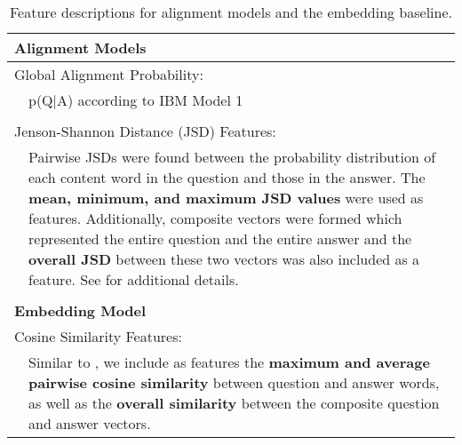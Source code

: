 

\begin{table*}[t]{}
        \centering
        \begin{tabular}{p{1cm}p{10cm}}
		\hline        
        \multicolumn{2}{l}{\bf Alignment Models} \\
        \hline
        \multicolumn{2}{l}{Global Alignment Probability:} \\
		  &  p(Q$|$A) according to IBM Model 1 \cite{Brown:93} \\ 
		\\        
        \multicolumn{2}{l}{Jenson-Shannon Distance (JSD) Features:} \\         
         {  } & {Pairwise JSDs were found between the probability distribution of each content word in the question and those in the answer.  The \textbf{mean, minimum, and maximum JSD values} were used as features. Additionally, composite vectors were formed which represented the entire question and the entire answer and the \textbf{overall JSD} between these two vectors was also included as a feature. See \citet{fried2015higher} for additional details.} \\
		\\        
        \hline
		 \multicolumn{2}{l}{\bf Embedding Model} \\
		 \hline
		 \multicolumn{2}{l}{Cosine Similarity Features:} \\        
         {  } & {Similar to \citet{jansen14}, we include as features the {\bf maximum and average pairwise cosine similarity} between question and answer words, as well as the {\bf overall similarity} between the composite question and answer vectors.} \\
        \end{tabular}
        \caption{Feature descriptions for alignment models and the embedding baseline.}
        \label{tab:Features}
	
\end{table*}

